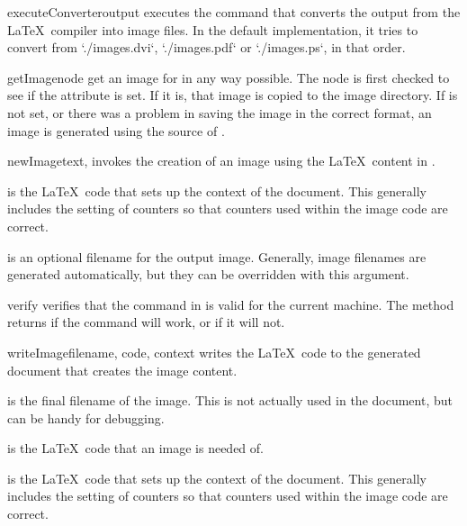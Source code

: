 \begin{methoddesc}[Imager]{executeConverter}{output}
executes the command that converts the output from the \LaTeX\ compiler
into image files. In the default implementation, it tries to convert from
`./images.dvi`, `./images.pdf` or `./images.ps`, in that order.
\end{methoddesc}

\begin{methoddesc}[Imager]{getImage}{node}
get an image for  in any way possible.  The node is first checked
to see if the  attribute is set.  If it is, that
image is copied to the image directory.  If  is
not set, or there was a problem in saving the image in the correct format,
an image is generated using the source of .
\end{methoddesc}

\begin{methoddesc}[Imager]{newImage}{text, }
invokes the creation of an image using the \LaTeX\ content in .

 is the \LaTeX\ code that sets up the context of the document.
This generally includes the setting of counters so that counters used
within the image code are correct.

 is an optional filename for the output image.  Generally,
image filenames are generated automatically, but they can be overridden
with this argument.
\end{methoddesc}

\begin{methoddesc}[Imager]{verify}{}
verifies that the command in  is valid for the current
machine.  The  method returns  if the command will
work, or  if it will not.
\end{methoddesc}

\begin{methoddesc}[Imager]{writeImage}{filename, code, context}
writes the \LaTeX\ code to the generated document that creates the
image content.

 is the final filename of the image.  This is not actually
used in the document, but can be handy for debugging.

 is the \LaTeX\ code that an image is needed of.

 is the \LaTeX\ code that sets up the context of the document.
This generally includes the setting of counters so that counters used
within the image code are correct.
\end{methoddesc}

